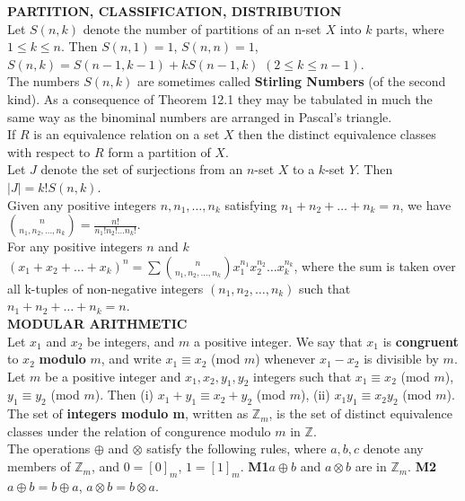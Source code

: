 \documentclass[10pt,landscape]{article}
\begin{document}
\begin{multicols}{4}
\textbf{PARTITION, CLASSIFICATION, DISTRIBUTION}\\
Let $S(n,k)$ denote the number of partitions of an n-set $X$ into $k$
parts, where $1 \leq k \leq n$. Then $S(n,1) = 1$, $S(n,n) = 1$,
$S(n,k) = S(n-1, k-1) + kS(n-1,k)$ $(2 \leq k \leq n-1)$.\\
The numbers $S(n,k)$ are sometimes called \textbf{Stirling Numbers}
(of the second kind). As a consequence of Theorem 12.1 they may be
tabulated in much the same way as the binominal numbers are arranged
in Pascal's triangle.\\
If $R$ is an equivalence relation on a set $X$ then the distinct
equivalence classes with respect to $R$ form a partition of $X$.\\
Let $J$ denote the set of surjections from an $n$-set $X$ to a $k$-set
$Y$. Then $|J| = k!S(n,k)$.\\
Given any positive integers $n, n_{1}, \dots ,n_{k}$ satisfying
$n_{1} + n_{2} + \dots + n_{k} = n$, we have
$\binom{n}{n_{1},n_{2},\dots,n_{k}}=\frac{n!}{n_{1}!n_{2}!\dots
  n_{k}!}$.\\
For any positive integers $n$ and $k$ $(x_{1}+ x_{2} + \dots
+ x_{k})^{n} = \sum \binom{n}{n_{1},n_{2}, \dots
  ,n_{k}} x_{1}^{n_{1}} x_{2}^{n_{2}} \dots x_{k}^{n_{k}}$, where the sum
    is taken over all k-tuples of non-negative integers $(n_{1},
    n_{2}, \dots, n_{k})$ such that $n_{1}+n_{2}+ \dots + n_{k} = n$.\\   
\textbf{MODULAR ARITHMETIC}\\
Let $x_{1}$ and $x_{2}$ be integers, and $m$ a positive integer. We
say that $x_{1}$ is \textbf{congruent} to $x_{2}$ \textbf{modulo} $m$,
and write $x_{1} \equiv x_{2}$ (mod $m$) whenever $x_{1} - x_{2}$ is
divisible by $m$.\\
Let $m$ be a positive integer and $x_{1}, x_{2}, y_{1}, y_{2}$
integers such that $x_{1} \equiv x_{2}$ (mod $m$), $y_{1} \equiv y_{2}$
(mod $m$). Then (i) $x_{1} + y_{1} \equiv x_{2} + y_{2}$ (mod $m$), (ii)
$x_{1}y_{1} \equiv x_{2}y_{2}$ (mod $m$).\\
The set of \textbf{integers modulo m}, written as $\mathbb{Z}_{m}$, is
the set of distinct equivalence classes under the relation of
congurence modulo $m$ in $\mathbb{Z}$.\\
The operations $\oplus$ and $\otimes$ satisfy the following rules,
where $a,b,c$ denote any members of $\mathbb{Z}_{m}$, and $0
= [0]_{m}$, $1 = [1]_{m}$.
\textbf{M1}$a \oplus b$ and $a \otimes b$ are in $\mathbb{Z}_{m}$.
\textbf{M2}$a \oplus b = b \oplus a$, $a \otimes b = b \otimes a$.

\end{multicols}
\end{document}
